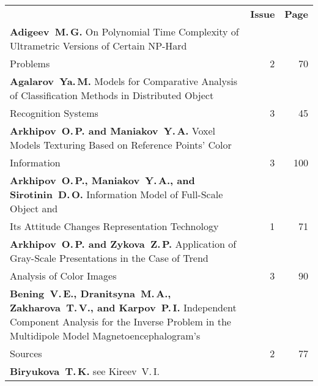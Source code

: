 {\tabcolsep=2.8pt
\begin{tabular}{p{399pt}rr}
&\textbf{Issue} & \textbf{Page}\\[6pt]
\textbf{Adigeev~M.\,G.} On Polynomial Time Complexity of Ultrametric Versions of Certain
NP-Hard\linebreak
\vspace*{-12pt}\\
\hspace*{23pt}Problems\dotfill&2&70\\
\textbf{Agalarov~Ya.\,M.} Models for Comparative Analysis of Classification Methods in
Distributed Object\linebreak
\vspace*{-12pt}\\
\hspace*{23pt}Recognition Systems\dotfill&3&45\\
\textbf{Arkhipov~O.\,P. and Maniakov~Y.\,A.} Voxel Models Texturing Based on Reference
Points' Color\linebreak
\vspace*{-12pt}\\
\hspace*{23pt}Information\dotfill&3&100\\
\textbf{Arkhipov~O.\,P., Maniakov~Y.\,A., and Sirotinin~D.\,O.} Information Model of Full-Scale
Object and\linebreak
\vspace*{-12pt}\\
\hspace*{23pt}Its Attitude Changes Representation Technology\dotfill&1&71\\
\textbf{Arkhipov~O.\,P. and Zykova~Z.\,P.} Application of Gray-Scale Presentations in the Case
of Trend\linebreak
\vspace*{-12pt}\\
\hspace*{23pt}Analysis of Color Images\dotfill&3&90\\
\hangindent=23pt\noindent\textbf{Bening~V.\,E., Dranitsyna~M.\,A., Zakharova~T.\,V., and Karpov~P.\,I.} Independent
Component Analysis for the Inverse Problem in the Multidipole Model
Magnetoencephalogram's\linebreak
\vspace*{-12pt}\\
\hspace*{23pt}Sources\dotfill&2&77\\
\textbf{Biryukova~T.\,K.} see Kireev~V.\,I.&&\\

\end{tabular}}
